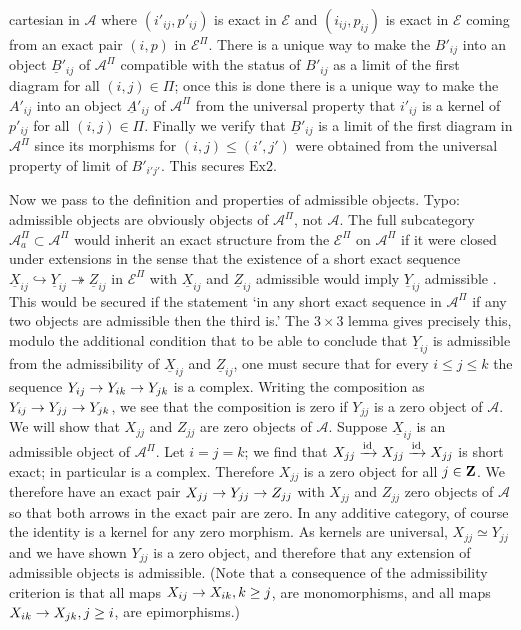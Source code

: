 \documentclass[deligne.tex]{subfiles}
\begin{document}
cartesian in $\mathcal A$
where $(i'_{ij},p'_{ij})$ is exact in $\mathcal E$ and
$(i_{ij},p_{ij})$ is exact in $\mathcal E$ coming from an exact pair
$(i,p)$ in $\mathcal E^\Pi$.
There is a unique way to make the $B'_{ij}$ into an object 
$\underline B'_{ij}$ of $\mathcal A^\Pi$
compatible with the status of $B'_{ij}$ as a limit of the first diagram
for all $(i,j)\in\Pi$; once this is done there is a unique way to make
the $A'_{ij}$ into an object $\underline A'_{ij}$ of $\mathcal A^\Pi$ from
the universal property that $i'_{ij}$ is a kernel of $p'_{ij}$ for all
$(i,j)\in\Pi$. Finally we verify that $\underline B'_{ij}$ is a limit of the
first diagram in $\mathcal A^\Pi$ since its morphisms for $(i,j)\leq(i',j')$ 
were obtained from the universal property of limit of $B'_{i'j'}$.
This secures $\text{Ex2}$.

Now we pass to the definition and properties of admissible objects.
Typo: admissible objects are obviously objects of $\mathcal A^\Pi$, not
$\mathcal A$.
The full subcategory $\mathcal A_a^\Pi\subset\mathcal A^\Pi$ would inherit
an exact structure from the $\mathcal E^\Pi$ on $\mathcal A^\Pi$ if it were 
closed under extensions in the sense that the existence of a short exact 
sequence
$\underline X_{ij}\hookrightarrow\underline Y_{ij}\twoheadrightarrow\underline Z_{ij}$
in $\mathcal E^\Pi$ with $\underline X_{ij}$ and $\underline Z_{ij}$
admissible would imply $\underline Y_{ij}$ admissible
\cite[10.20]{buhler}. This would be secured if the statement `in any short
exact sequence in $\mathcal A^\Pi$ if any two objects are admissible then 
the third is.' The $3\times3$ lemma \cite[3.6]{buhler} gives precisely this,
modulo the additional condition that to be able to conclude that
$\underline Y_{ij}$ is admissible from the admissibility of
$\underline X_{ij}$ and $\underline Z_{ij}$, one must secure that for every
$i\leq j\leq k$ the sequence $Y_{ij}\rightarrow Y_{ik}\rightarrow Y_{jk}$ is a complex.
Writing the composition as $Y_{ij}\rightarrow Y_{jj}\rightarrow Y_{jk}$, we see that the
composition is zero if $Y_{jj}$ is a zero object of $\mathcal A$.
We will show that $X_{jj}$ and $Z_{jj}$ are zero objects of $\mathcal A$.
Suppose $\underline X_{ij}$ is an admissible object of $\mathcal A^\Pi$.
Let $i=j=k$; we find that $X_{jj}\xrightarrow{\operatorname{id}} X_{jj}\xrightarrow{\operatorname{id}} X_{jj}$ is short 
exact; in particular is a complex. Therefore $X_{jj}$ is a zero object for
all $j\in\mathbf{Z}$. We therefore have an exact pair $X_{jj}\rightarrow Y_{jj}\rightarrow Z_{jj}$
with $X_{jj}$ and $Z_{jj}$ zero objects of $\mathcal A$ so that both arrows
in the exact pair are zero. In any additive category, of course the identity
is a kernel for any zero morphism. As kernels are universal,
$X_{jj}\simeq Y_{jj}$ and we have shown $Y_{jj}$ is a zero object, and
therefore that any extension of admissible objects is admissible.
(Note that a consequence of the admissibility criterion is that all maps
$X_{ij}\rightarrow X_{ik},k\geq j$, are monomorphisms, and all maps
$X_{ik}\rightarrow X_{jk},j\geq i$, are epimorphisms.)
\end{document}
